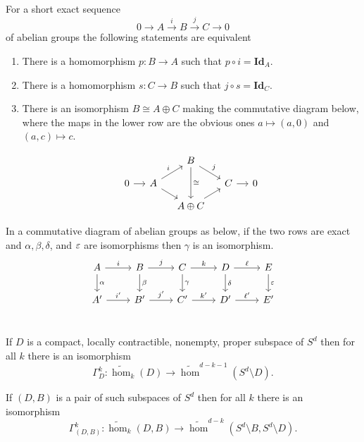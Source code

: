 
\begin{lemma}\label{lem:splitting}
  For a short exact sequence \[0\to A\xrightarrow{i} B\xrightarrow{j} C\to 0\] of abelian groups the following statements are equivalent
  \begin{enumerate}
    \item There is a homomorphism $p: B\to A$ such that $p\circ i = \mathbf{Id}_A$.
    \item There is a homomorphism $s: C\to B$ such that $j\circ s = \mathbf{Id}_C$.
    \item There is an isomorphism $B\cong A\oplus C$ making the commutative diagram below, where the maps in the lower row are the obvious ones $a\mapsto (a, 0)$ and $(a,c)\mapsto c$.

    \[\begin{tikzcd}[column sep=small, row sep=small]
              &                       & B\ar[dd, "\cong"]\ar[dr,"j"]  &         & \\
      0\ar[r] & A\ar[ur, "i"]\ar[dr]  &                               & C\ar[r] & 0\\
              &                       & A\oplus C\ar[ur]              &         &
    \end{tikzcd}\]
  \end{enumerate}
\end{lemma}

\begin{lemma}\label{lem:five}
  In a commutative diagram of abelian groups as below, if the two rows are exact and $\alpha,\beta,\delta$, and $\varepsilon$ are isomorphisms then $\gamma$ is an isomorphism.
  \[\begin{tikzcd}
      A\ar[r, "i"]\ar[d, "\alpha"]
    & B\ar[r, "j"]\ar[d, "\beta"]
    & C\ar[r, "k"]\ar[d, "\gamma"]
    & D\ar[r, "\ell"]\ar[d, "\delta"]
    & E\ar[d, "\e"]\\
      A'\ar[r, "i'"]
    & B'\ar[r, "j'"]
    & C'\ar[r, "k'"]
    & D'\ar[r, "\ell'"]
    & E'\\
  \end{tikzcd}\]
\end{lemma}

\begin{theorem}\label{thm:alexander}
  If $D$ is a compact, locally contractible, nonempty, proper subspace of $S^d$ then for all $k$ there is an isomorphism
  \[ \Gamma_D^k : \tilde{\hom}_k(D)\to \tilde{\hom}^{d-k-1}(S^d\setminus D). \]

  If $(D, B)$ is a pair of such subspaces of $S^d$ then for all $k$ there is an isomorphism
  \[ \Gamma_{(D,B)}^k : \tilde{\hom}_k(D, B)\to \tilde{\hom}^{d-k}(S^d\setminus B, S^d\setminus D). \]
\end{theorem}

